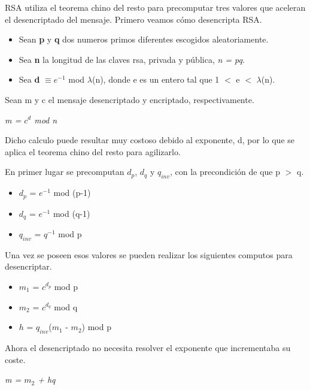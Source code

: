 \documentclass[11pt]{article}
\begin{document}
      \bigskip
      \par
      RSA utiliza el teorema chino del resto para precomputar tres valores que aceleran el
      desencriptado del mensaje. Primero veamos cómo desencripta RSA.
      \begin{itemize}
        \item Sean \textbf{p} y \textbf{q} dos numeros primos diferentes escogidos aleatoriamente.
        \item Sea \textbf{n} la longitud de las claves rsa, privada y pública, \textit{n = pq}.
        \item Sea \textbf{d} $\equiv e^{-1}$ mod $\lambda$(n), donde e es un entero tal que 1 $<$
          e $<$ $\lambda$(n).
      \end{itemize}
      Sean m y c el mensaje desencriptado y encriptado, respectivamente.
      \begin{center}
        \Large
        \textit{m = $c^d$ mod n}
      \end{center}

      \par
      Dicho calculo puede resultar muy costoso debido al exponente, d, por lo que se aplica el
      teorema chino del resto para agilizarlo.

      \bigskip
      \par
      En primer lugar se precomputan $d_p$, $d_q$ y $q_{inv}$, con la precondición de que p $>$ q.
      \begin{itemize}
        \item $d_p$ = $e^{-1}$ mod (p-1)
        \item $d_q$ = $e^{-1}$ mod (q-1)
        \item $q_{inv}$ = $q^{-1}$ mod p
      \end{itemize}

      \par
      Una vez se poseen esos valores se pueden realizar los siguientes computos para desencriptar.
      \begin{itemize}
        \item $m_1$ = $c^{d_p}$ mod p
        \item $m_2$ = $c^{d_q}$ mod q
        \item $h$ = $q_{inv}$($m_1$ - $m_2$) mod p
      \end{itemize}

      \par
      Ahora el desencriptado no necesita resolver el exponente que incrementaba su coste.
      \begin{center}
        \Large
        \textit{m = $m_2$ + hq}
      \end{center}
\end{document}
